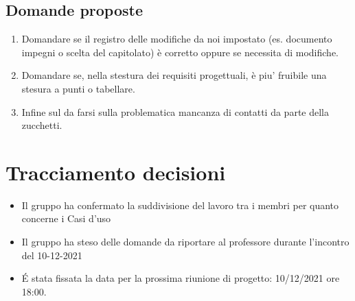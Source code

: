 \subsection{Domande proposte}
\begin{enumerate}
	\item Domandare se il registro delle modifiche da noi impostato (es. documento impegni o scelta del capitolato) è corretto oppure se necessita di modifiche.
	\item Domandare se, nella stestura dei requisiti progettuali, è piu' fruibile una stesura a punti o tabellare.
	\item Infine sul da farsi sulla problematica mancanza di contatti da parte della zucchetti.
\end{enumerate}

\section{Tracciamento decisioni}
\begin{itemize}
	\item Il gruppo ha confermato la suddivisione del lavoro tra i membri per quanto concerne i Casi d'uso
	\item Il gruppo ha steso delle domande da riportare al professore durante l'incontro del 10-12-2021

	\item \' E stata fissata la data per la prossima riunione di progetto: 10/12/2021 ore 18:00.
\end{itemize}